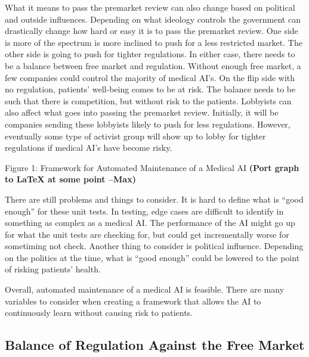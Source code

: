 \documentclass[]{article}
\begin{document}
		What it means to pass the premarket review can also change based on political and outside influences. Depending on what ideology controls the government can drastically change how hard or easy it is to pass the premarket review. One side is more of the spectrum is more inclined to push for a less restricted market. The other side is going to push for tighter regulations. In either case, there needs to be a balance between free market and regulation. Without enough free market, a few companies could control the majority of medical AI’s. On the flip side with no regulation, patients’ well-being comes to be at risk. The balance needs to be such that there is competition, but without risk to the patients. Lobbyists can also affect what goes into passing the premarket review. Initially, it will be companies sending these lobbyists likely to push for less regulations. However, eventually some type of activist group will show up to lobby for tighter regulations if medical AI’s have become risky.

		Figure 1: Framework for Automated Maintenance of a Medical AI \textbf{(Port graph to LaTeX at some point --Max)}

		There are still problems and things to consider. It is hard to define what is “good enough” for these unit tests. In testing, edge cases are difficult to identify in something as complex as a medical AI. The performance of the AI might go up for what the unit tests are checking for, but could get incrementally worse for sometiming not check. Another thing to consider is political influence. Depending on the politics at the time, what is “good enough” could be lowered to the point of risking patients’ health.
	
		Overall, automated maintenance of a medical AI is feasible. There are many variables to consider when creating a framework that allows the AI to continuously learn without causing risk to patients. 

	\subsection{Balance of Regulation Against the Free Market}

		

\medskip



		
\end{document}
